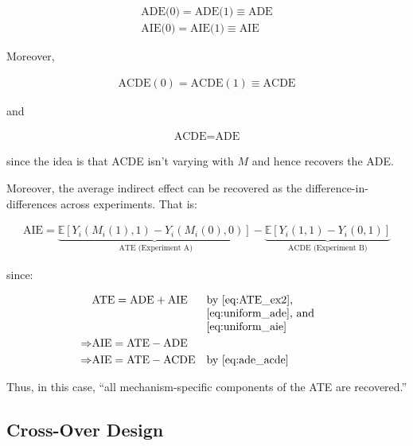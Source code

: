 \documentclass[10pt]{article}
\begin{document}
\begin{align}
    \text{ADE(0)} = \text{ADE(1)} \equiv \text{ADE} \label{eq:uniform_ade} \\
    \text{AIE(0)} = \text{AIE(1)} \equiv \text{AIE} \label{eq:uniform_aie}
\end{align}

Moreover, 

\begin{align}
    \text{ACDE}(0) = \text{ACDE}(1) \equiv \text{ACDE}
\end{align}

and 

\begin{align}
    \text{ACDE} = \text{ADE} \label{eq:ade_acde}
\end{align}

since the idea is that ACDE isn't varying with $M$
and hence recovers the ADE.

Moreover, the average indirect 
effect can be recovered as the 
difference-in-differences 
across experiments. That is:

\begin{align}
    \text{AIE} = \underbrace{\mathbb{E}\left[Y_i\left(M_i(1), 1\right)-Y_i\left(M_i(0), 0\right)\right]}_{\text { ATE (Experiment A)}}-\underbrace{\mathbb{E}\left[Y_i(1,1)-Y_i(0,1)\right]}_{\text{ACDE (Experiment B)}}
\end{align}

since:

\begin{align}
    &\text{ATE} = \text{ADE} + \text{AIE} && \parbox[t]{4cm}{\raggedright by \eqref{eq:ATE_ex2}, \eqref{eq:uniform_ade}, and \eqref{eq:uniform_aie}} \\
    \Rightarrow &\text{AIE} = \text{ATE} - \text{ADE} \\ 
    \Rightarrow &\text{AIE} = \text{ATE} - \text{ACDE} && \parbox[t]{4cm}{\raggedright by \eqref{eq:ade_acde}}
\end{align}

Thus, in this case, 
``all mechanism-specific components of the ATE are recovered.''

\subsection{Cross-Over Design}
\end{document}
